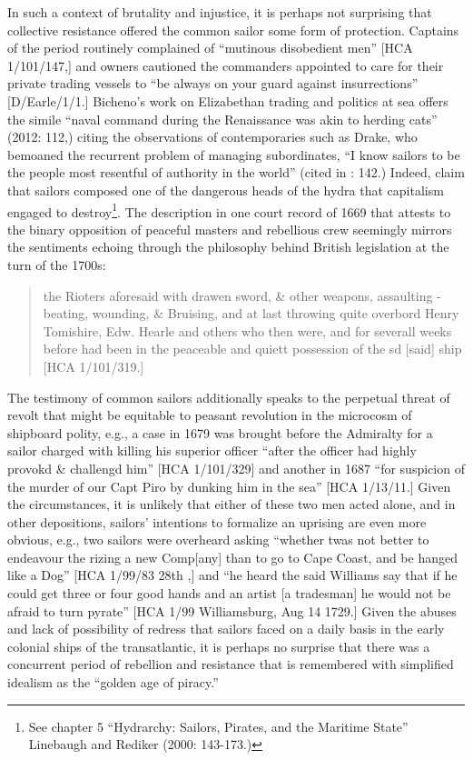   In such a context of brutality and injustice, it is perhaps not surprising that collective resistance offered the common sailor some form of protection. Captains of the period routinely complained of “mutinous disobedient men” [HCA 1/101/147,] and owners cautioned the commanders appointed to care for their private trading vessels to “be always on your guard against insurrections” [D/Earle/1/1.] Bicheno’s work on Elizabethan trading and politics at sea offers the simile “naval command during the Renaissance was akin to herding cats” (2012: 112,) citing the observations of contemporaries such as Drake, who bemoaned the recurrent problem of managing subordinates, “I know sailors to be the people most resentful of authority in the world” (cited in \citealt{Bicheno2012}: 142.) Indeed, \citet{LinebaughRediker2000} claim that sailors composed one of the dangerous heads of the hydra that capitalism engaged to destroy\footnote{See chapter 5 “Hydrarchy: Sailors, Pirates, and the Maritime State” Linebaugh and Rediker (2000: 143-173.)}. The description in one court record of 1669 that attests to the binary opposition of peaceful masters and rebellious crew seemingly mirrors the sentiments echoing through the philosophy behind British legislation at the turn of the 1700s:

\begin{quotation}
the Rioters aforesaid with drawen sword, \& other weapons, assaulting - beating, wounding, \& Bruising, and at last throwing quite overbord Henry Tomishire, Edw. Hearle and others who then were, and for severall weeks before had been in the peaceable and quiett possession of the sd [said] ship [HCA 1/101/319.] \end{quotation}

The testimony of common sailors additionally speaks to the perpetual threat of revolt that might be equitable to peasant revolution in the microcosm of shipboard polity, e.g., a case in 1679 was brought before the Admiralty for a sailor charged with killing his superior officer “after the officer had highly provokd \& challengd him” [HCA 1/101/329] and another in 1687 “for suspicion of the murder of our Capt Piro by dunking him in the sea” [HCA 1/13/11.] Given the circumstances, it is unlikely that either of these two men acted alone, and in other depositions, sailors’ intentions to formalize an uprising are even more obvious, e.g., two sailors were overheard asking “whether twas not better to endeavour the rizing a new Comp[any] than to go to Cape Coast, and be hanged like a Dog” [HCA 1/99/83 28th \citealt{March1722},] and “he heard the said Williams say that if he could get three or four good hands and an artist [a tradesman] he would not be afraid to turn pyrate” [HCA 1/99 Williamsburg, Aug 14 1729.] Given the abuses and lack of possibility of redress that sailors faced on a daily basis in the early colonial ships of the transatlantic, it is perhaps no surprise that there was a concurrent period of rebellion and resistance that is remembered with simplified idealism as the “golden age of piracy.”

